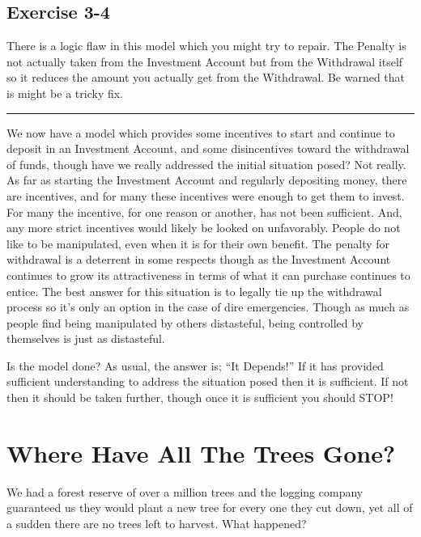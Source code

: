 \documentclass[]{memoir}
\begin{document}
\subsection{Exercise 3-4}

There is a logic flaw in this model which you might try to repair. The
Penalty is not actually taken from the Investment Account but from the
Withdrawal itself so it reduces the amount you actually get from the
Withdrawal. Be warned that is might be a tricky fix.

\begin{center}\rule{3in}{0.4pt}\end{center}

We now have a model which provides some incentives to start and continue
to deposit in an Investment Account, and some disincentives toward the
withdrawal of funds, though have we really addressed the initial
situation posed? Not really. As far as starting the Investment Account
and regularly depositing money, there are incentives, and for many these
incentives were enough to get them to invest. For many the incentive,
for one reason or another, has not been sufficient. And, any more strict
incentives would likely be looked on unfavorably. People do not like to
be manipulated, even when it is for their own benefit. The penalty for
withdrawal is a deterrent in some respects though as the Investment
Account continues to grow its attractiveness in terms of what it can
purchase continues to entice. The best answer for this situation is to
legally tie up the withdrawal process so it's only an option in the case
of dire emergencies. Though as much as people find being manipulated by
others distasteful, being controlled by themselves is just as
distasteful.

Is the model done? As usual, the answer is; ``It Depends!'' If it has
provided sufficient understanding to address the situation posed then it
is sufficient. If not then it should be taken further, though once it is
sufficient you should STOP!

\section{Where Have All The Trees Gone?}

We had a forest reserve of over a million trees and the logging company
guaranteed us they would plant a new tree for every one they cut down,
yet all of a sudden there are no trees left to harvest. What happened?

\FloatBarrier 
\end{document}
